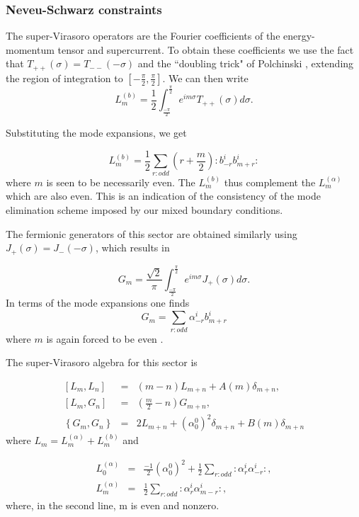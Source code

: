 \documentclass[a4paper,a4paper]{article}
\begin{document}
\subsubsection{Neveu-Schwarz constraints}

The super-Virasoro operators are the Fourier coefficients of the
energy-momentum tensor and supercurrent. To obtain these
coefficients we use the fact that $T_{++}(\sigma)=T_{--}(-\sigma)$
and the ``doubling trick" of Polchinski \cite{Pol}, extending the
region of integration to $[-\frac{\pi}{2},\frac{\pi}{2}]$.  We can
then write
\begin{equation}
L_{m}^{(b)}=\frac{1}{2}\int_{\frac{-\pi}{2}}^{\frac{\pi}{2}}e^{im\sigma}
T_{++}(\sigma)d\sigma.
\end{equation}

Substituting the mode expansions, we get

\begin{equation}
L_{m}^{(b)}=\frac{1}{2}\sum_{r:odd}(r+\frac{m}{2}):b_{-r}^{i}b_{m+r}^{i}:
\end{equation}
where $m$ is seen to be necessarily even.  The $L_{m}^{(b)}$ thus
complement the $L_{m}^{(\alpha)}$ which are also even.  This is an
indication of the consistency of the mode elimination scheme
imposed by our mixed boundary conditions.

The fermionic generators of this sector are obtained similarly
using $J_{+}(\sigma)=J_{-}(-\sigma)$, which results in

\begin{equation}
G_{m}=\frac{\sqrt{2}}{\pi}\int_{\frac{-\pi}{2}}^{\frac{\pi}{2}}e^{im\sigma}J_{+}(\sigma)d\sigma.
\end{equation}
In terms of the mode expansions one finds
\begin{equation}
G_{m}=\sum_{r:odd}\alpha_{-r}^{i}b_{m+r}^{i}
\end{equation}
where $m$ is again forced to be even .

The super-Virasoro algebra for this sector is

\begin{eqnarray}
\left[L_{m},L_{n}\right]&=&(m-n)L_{m+n}+A(m)\delta_{m+n},\\
\left[L_{m},G_{n}\right]&=&(\frac{m}{2}-n)G_{m+n},\\
\left\{G_{m},G_{n}\right\}&=&2L_{m+n}+(\alpha^{0}_{0})^2
\delta_{m+n} + B(m)\delta_{m+n}
\end{eqnarray}
where $L_{m}=L_{m}^{(\alpha)}+L_{m}^{(b)}$ and

\begin{eqnarray}
L_{0}^{(\alpha)}&=&\frac{-1}{2}(\alpha_{0}^{0})^{2}+\frac{1}{2}\sum_{r:odd}:\alpha_{r}^{i}\alpha_{-r}^{i}:,\\
L_{m}^{(\alpha)}&=&\frac{1}{2}\sum_{r:odd}:\alpha_{r}^{i}\alpha_{m-r}^{i}:,
\end{eqnarray}
where, in the second line, m is even and nonzero.
\end{document}
